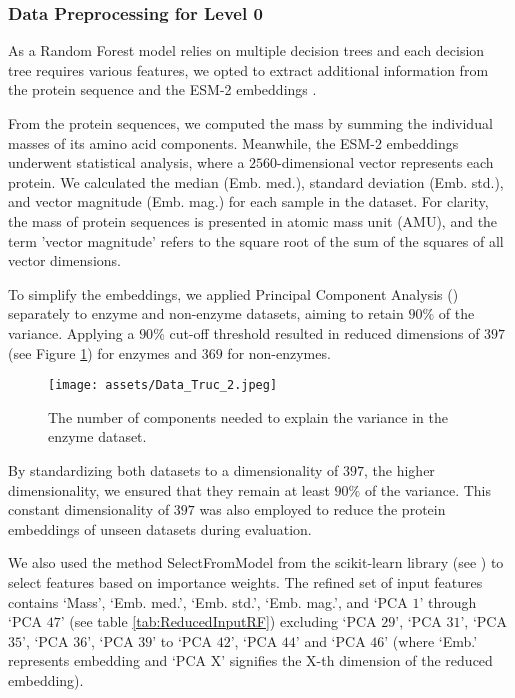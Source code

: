 \documentclass{bioinfo}
\begin{document}
\begin{methods}
\subsubsection{Data Preprocessing for Level 0}
As a Random Forest model relies on multiple decision trees and each
decision tree requires various features, we opted to extract additional
information from the protein sequence and the ESM-2 embeddings \cite{ESM2}.

From the protein sequences, we computed the mass by summing the individual masses of its amino acid components. 
Meanwhile, the ESM-2 embeddings underwent statistical analysis, where a $2560$-dimensional vector represents each protein.
We calculated the median (Emb. med.), standard deviation (Emb. std.), and vector magnitude (Emb. mag.) for each sample in the dataset.
For clarity, the mass of protein sequences is presented in atomic mass unit (AMU),
and the term 'vector magnitude' refers to the square root of the sum of the squares of all vector dimensions.

To simplify the embeddings, we applied Principal Component Analysis (\cite{scikit-learn})
separately to enzyme and non-enzyme datasets,
aiming to retain $90\%$ of the variance. Applying a $90\%$ cut-off threshold resulted in reduced dimensions of $397$ (see Figure \ref{fig:PCA_enzymes}) for enzymes and $369$ for non-enzymes. 

\begin{figure}[!tbp]
\texttt{[image: assets/Data\_Truc\_2.jpeg]}
\caption{The number of components needed to explain the variance in the enzyme dataset.}\label{fig:PCA_enzymes}
\end{figure}

By standardizing both datasets to a dimensionality of $397$, the higher dimensionality, we ensured that they remain at least $90\%$ of the variance.
This constant dimensionality of $397$ was also employed to reduce the protein embeddings of unseen datasets during evaluation.

We also used the method SelectFromModel from the scikit-learn library (see \cite{scikit-learn})
to select features based on importance weights. 
The refined set of input features contains 
‘Mass’, ‘Emb. med.’, ‘Emb. std.’, ‘Emb. mag.’, and ‘PCA $1$’ through ‘PCA $47$’ (see table \ref{tab:ReducedInputRF}) excluding ‘PCA $29$’, ‘PCA $31$’, ‘PCA $35$’,
‘PCA $36$’, ‘PCA $39$’ to ‘PCA $42$’, ‘PCA $44$’ and ‘PCA $46$’ (where ‘Emb.’ represents embedding and ‘PCA X’ signifies the X-th dimension of the reduced embedding).


\end{methods}
\end{document}
